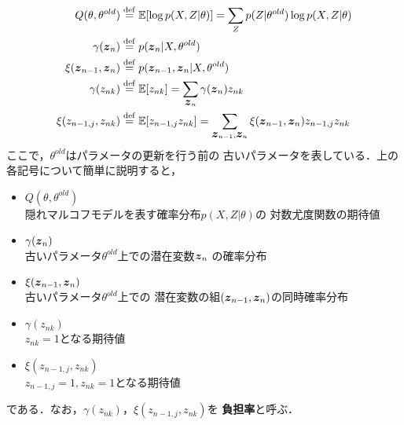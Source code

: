 \begin{align}
    Q(\theta, \theta^{old}) &\overset{\mathrm{def}}{=} \mathbb{E}[\log p(X, Z| \theta)] = \sum_Zp(Z| \theta^{old})\log p(X, Z| \theta) \\
    \gamma(\mbox{\boldmath $z$}_n) &\overset{\mathrm{def}}{=} p(\mbox{\boldmath $z$}_n|X, \theta^{old}) \\
    \xi(\mbox{\boldmath $z$}_{n-1},\mbox{\boldmath $z$}_n) &\overset{\mathrm{def}}{=} p(\mbox{\boldmath $z$}_{n-1},\mbox{\boldmath $z$}_n|X,\theta^{old}) \\
    \gamma(z_{nk}) &\overset{\mathrm{def}}{=} \mathbb{E}[z_{nk}] = \sum_{\mbox{\boldmath $z$}_n}\gamma(\mbox{\boldmath $z$}_n)z_{nk} \\
    \xi(z_{n-1,j},z_{nk}) &\overset{\mathrm{def}}{=} \mathbb{E}[z_{n-1,j}z_{nk}] = \sum_{\mbox{\boldmath $z$}_{n-1},\mbox{\boldmath $z$}_n}\xi(\mbox{\boldmath $z$}_{n-1},\mbox{\boldmath $z$}_n)z_{n-1,j}z_{nk} \\
\end{align}
ここで，$\theta^{old}$はパラメータの更新を行う前の
古いパラメータを表している．上の各記号について簡単に説明すると，
\begin{itemize}
\item $Q(\theta,\theta^{old})$ \\
  隠れマルコフモデルを表す確率分布$p(X,Z|\theta)$の
  対数尤度関数の期待値
\item $\gamma(\mbox{\boldmath $z$}_n)$ \\
  古いパラメータ$\theta^{old}$上での潜在変数$\mbox{\boldmath $z$}_n$
  の確率分布
\item $\xi(\mbox{\boldmath $z$}_{n-1},\mbox{\boldmath $z$}_n)$ \\
  古いパラメータ$\theta^{old}$上での
  潜在変数の組$(\mbox{\boldmath $z$}_{n-1},\mbox{\boldmath $z$}_n)$の同時確率分布
\item $\gamma(z_{nk})$ \\
  $z_{nk}=1$となる期待値
\item $\xi(z_{n-1,j},z_{nk})$ \\
  $z_{n-1,j}=1,z_{nk}=1$となる期待値
\end{itemize}

である．なお，$\gamma(z_{nk})$，$\xi(z_{n-1,j},z_{nk})$を
\textbf{負担率}と呼ぶ．

